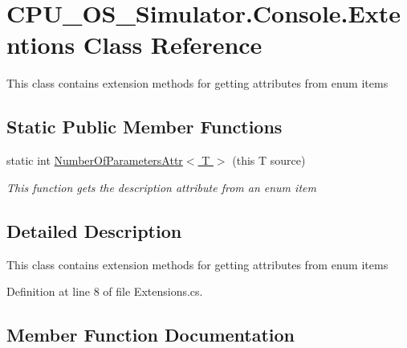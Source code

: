 \hypertarget{class_c_p_u___o_s___simulator_1_1_console_1_1_extentions}{}\section{C\+P\+U\+\_\+\+O\+S\+\_\+\+Simulator.\+Console.\+Extentions Class Reference}
\label{class_c_p_u___o_s___simulator_1_1_console_1_1_extentions}


This class contains extension methods for getting attributes from enum items  


\subsection*{Static Public Member Functions}
\begin{DoxyCompactItemize}
\item 
static int \hyperlink{class_c_p_u___o_s___simulator_1_1_console_1_1_extentions_a3496e569943109589d523e9854148b6c}{Number\+Of\+Parameters\+Attr$<$ T $>$} (this T source)
\begin{DoxyCompactList}\small\item\em This function gets the description attribute from an enum item \end{DoxyCompactList}\end{DoxyCompactItemize}


\subsection{Detailed Description}
This class contains extension methods for getting attributes from enum items 



Definition at line 8 of file Extensions.\+cs.



\subsection{Member Function Documentation}
\hypertarget{class_c_p_u___o_s___simulator_1_1_console_1_1_extentions_a3496e569943109589d523e9854148b6c}{}
